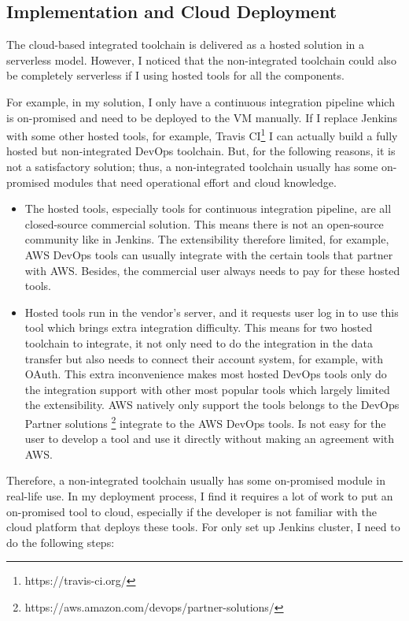 \subsection{Implementation and Cloud Deployment}
The cloud-based integrated toolchain is delivered as a hosted solution in a serverless model. However, I noticed that the non-integrated toolchain could also be completely serverless if I using hosted tools for all the components. 
\par
For example, in my solution, I only have a continuous integration pipeline which is on-promised and need to be deployed to the VM manually. If I replace Jenkins with some other hosted tools, for example, Travis CI\footnote{https://travis-ci.org/} I can actually build a fully hosted but non-integrated DevOps toolchain. But, for the following reasons, it is not a satisfactory solution; thus, a non-integrated toolchain usually has some on-promised modules that need operational effort and cloud knowledge.
\begin{itemize}
 \item The hosted tools, especially tools for continuous integration pipeline, are all closed-source commercial solution. This means there is not an open-source community like in Jenkins. The extensibility therefore limited, for example, AWS DevOps tools can usually integrate with the certain tools that partner with AWS. Besides, the commercial user always needs to pay for these hosted tools.
 \item Hosted tools run in the vendor's server, and it requests user log in to use this tool which brings extra integration difficulty. This means for two hosted toolchain to integrate, it not only need to do the integration in the data transfer but also needs to connect their account system, for example, with OAuth. This extra inconvenience makes most hosted DevOps tools only do the integration support with other most popular tools which largely limited the extensibility. AWS natively only support the tools belongs to the DevOps Partner solutions \footnote{https://aws.amazon.com/devops/partner-solutions/} integrate to the AWS DevOps tools. Is not easy for the user to develop a tool and use it directly without making an agreement with AWS.
\end{itemize}
Therefore, a non-integrated toolchain usually has some on-promised module in real-life use. In my deployment process, I find it requires a lot of work to put an on-promised tool to cloud, especially if the developer is not familiar with the cloud platform that deploys these tools. For only set up Jenkins cluster, I need to do the following steps:
